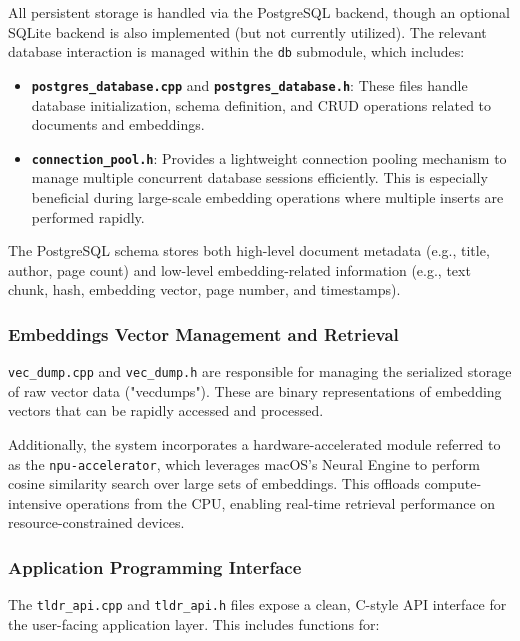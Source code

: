 All persistent storage is handled via the PostgreSQL backend, though an optional SQLite backend is also implemented (but not currently utilized). The relevant database interaction is managed within the \texttt{db} submodule, which includes:

\begin{itemize}
    \item \textbf{\texttt{postgres\_database.cpp}} and \textbf{\texttt{postgres\_database.h}}: These files handle database initialization, schema definition, and CRUD operations related to documents and embeddings.
    \item \textbf{\texttt{connection\_pool.h}}: Provides a lightweight connection pooling mechanism to manage multiple concurrent database sessions efficiently. This is especially beneficial during large-scale embedding operations where multiple inserts are performed rapidly.
\end{itemize}

The PostgreSQL schema stores both high-level document metadata (e.g., title, author, page count) and low-level embedding-related information (e.g., text chunk, hash, embedding vector, page number, and timestamps).

\subsubsection{Embeddings Vector Management and Retrieval}

\texttt{vec\_dump.cpp} and \texttt{vec\_dump.h} are responsible for managing the serialized storage of raw vector data ("vecdumps"). These are binary representations of embedding vectors that can be rapidly accessed and processed.

Additionally, the system incorporates a hardware-accelerated module referred to as the \texttt{npu-accelerator}, which leverages macOS’s Neural Engine to perform cosine similarity search over large sets of embeddings. This offloads compute-intensive operations from the CPU, enabling real-time retrieval performance on resource-constrained devices.

\subsubsection{Application Programming Interface}

The \texttt{tldr\_api.cpp} and \texttt{tldr\_api.h} files expose a clean, C-style API interface for the user-facing application layer. This includes functions for:

